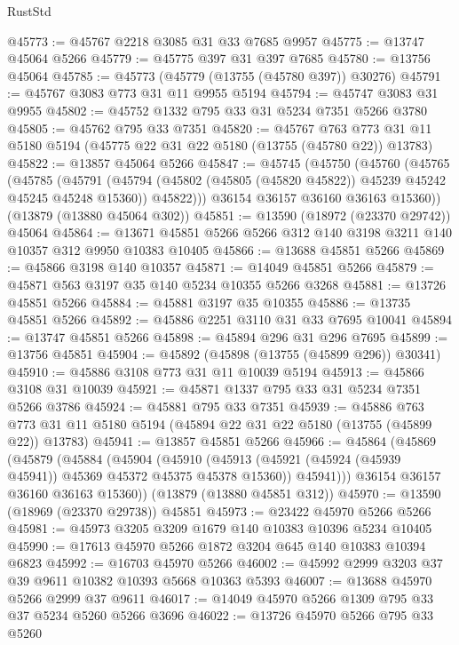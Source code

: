 \begin{lexlean}{RustStd}
\begin{coremodule}
@45773 := @45767 @2218 @3085 @31 @33 @7685 @9957
@45775 := @13747 @45064 @5266
@45779 := @45775 @397 @31 @397 @7685
@45780 := @13756 @45064
@45785 := @45773 (@45779 (@13755 (@45780 @397)) @30276)
@45791 := @45767 @3083 @773 @31 @11 @9955 @5194
@45794 := @45747 @3083 @31 @9955
@45802 := @45752 @1332 @795 @33 @31 @5234 @7351 @5266 @3780
@45805 := @45762 @795 @33 @7351
@45820 := @45767
    @763
    @773
    @31
    @11
    @5180
    @5194
    (@45775 @22 @31 @22 @5180 (@13755 (@45780 @22)) @13783)
@45822 := @13857 @45064 @5266
@45847 := @45745
    (@45750
      (@45760
        (@45765
          (@45785
            (@45791
              (@45794 (@45802 (@45805 (@45820 @45822)) @45239 @45242 @45245 @45248 @15360))
              @45822)))
        @36154
        @36157
        @36160
        @36163
        @15360))
    (@13879 (@13880 @45064 @302))
@45851 := @13590 (@18972 (@23370 @29742)) @45064
@45864 := @13671 @45851 @5266 @5266 @312 @140 @3198 @3211 @140 @10357 @312 @9950 @10383 @10405
@45866 := @13688 @45851 @5266
@45869 := @45866 @3198 @140 @10357
@45871 := @14049 @45851 @5266
@45879 := @45871 @563 @3197 @35 @140 @5234 @10355 @5266 @3268
@45881 := @13726 @45851 @5266
@45884 := @45881 @3197 @35 @10355
@45886 := @13735 @45851 @5266
@45892 := @45886 @2251 @3110 @31 @33 @7695 @10041
@45894 := @13747 @45851 @5266
@45898 := @45894 @296 @31 @296 @7695
@45899 := @13756 @45851
@45904 := @45892 (@45898 (@13755 (@45899 @296)) @30341)
@45910 := @45886 @3108 @773 @31 @11 @10039 @5194
@45913 := @45866 @3108 @31 @10039
@45921 := @45871 @1337 @795 @33 @31 @5234 @7351 @5266 @3786
@45924 := @45881 @795 @33 @7351
@45939 := @45886
    @763
    @773
    @31
    @11
    @5180
    @5194
    (@45894 @22 @31 @22 @5180 (@13755 (@45899 @22)) @13783)
@45941 := @13857 @45851 @5266
@45966 := @45864
    (@45869
      (@45879
        (@45884
          (@45904
            (@45910
              (@45913 (@45921 (@45924 (@45939 @45941)) @45369 @45372 @45375 @45378 @15360))
              @45941)))
        @36154
        @36157
        @36160
        @36163
        @15360))
    (@13879 (@13880 @45851 @312))
@45970 := @13590 (@18969 (@23370 @29738)) @45851
@45973 := @23422 @45970 @5266 @5266
@45981 := @45973 @3205 @3209 @1679 @140 @10383 @10396 @5234 @10405
@45990 := @17613 @45970 @5266 @1872 @3204 @645 @140 @10383 @10394 @6823
@45992 := @16703 @45970 @5266
@46002 := @45992 @2999 @3203 @37 @39 @9611 @10382 @10393 @5668 @10363 @5393
@46007 := @13688 @45970 @5266 @2999 @37 @9611
@46017 := @14049 @45970 @5266 @1309 @795 @33 @37 @5234 @5260 @5266 @3696
@46022 := @13726 @45970 @5266 @795 @33 @5260

\end{coremodule}
\end{lexlean}

